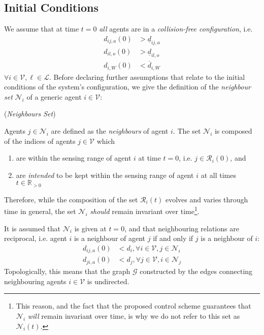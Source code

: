 \subsection{Initial Conditions}

We assume that at time $t=0$ \textit{all} agents are in a
\textit{collision-free configuration}, i.e.
\begin{subequations}
\begin{align}
    d_{ij,a}(0) &> \underline{d}_{ij,a} \\
    d_{il,o}(0) &> \underline{d}_{il,o} \\
    d_{i,W}(0)  &< \overline{d}_{i,W}
\label{eq:initially_coll_free}
\end{align}
\end{subequations}
$\forall i \in \mathcal{V}, \ell \in \mathcal{L}$. Before declaring further
assumptions that relate to the initial conditions of the system's configuration,
we give the definition of the \textit{neighbour set} $\mathcal{N}_i$ of a
generic agent $i \in \mathcal{V}$:
\begin{bw_box}
\begin{definition} (\textit{Neighbours Set})

Agents $j \in \mathcal{N}_i$ are defined as the \textit{neighbours} of
agent $i$. The set $\mathcal{N}_i$ is composed of the indices of agents
$j \in \mathcal{V}$ which
\begin{enumerate}
  \item are within the sensing range of agent $i$ at time $t=0$, i.e.
    $j \in \mathcal{R}_i(0)$, and
  \item are \textit{intended} to be kept within the sensing range of agent $i$ at all
    times $t \in \mathbb{R}_{> 0}$
\end{enumerate}
\end{definition}
\end{bw_box}

Therefore, while the composition of the set $\mathcal{R}_i(t)$ evolves and
varies through time in general, the set $\mathcal{N}_i$ \textit{should} remain
invariant over time\footnote{This reason, and the fact that the proposed
control scheme guarantees that $\mathcal{N}_i$ \textit{will} remain invariant
over time, is why we do not refer to this set as $\mathcal{N}_i(t)$.}.

It is assumed that $\mathcal{N}_i$ is given at $t=0$, and that neighbouring
relations are reciprocal, i.e. agent $i$ is a neighbour of agent $j$ if and
only if $j$ is a neighbour of $i$:
\begin{subequations}
\begin{align}
  d_{ij,a}(0) &< d_i, \forall i \in \mathcal{V}, j \in \mathcal{N}_i \label{eq:initially_connected_0} \\
  d_{ji,a}(0) &< d_j, \forall j \in \mathcal{V}, i \in \mathcal{N}_j \label{eq:initially_connected_1}
\end{align}
\end{subequations}
Topologically, this means that the graph $\mathcal{G}$ constructed by the edges
connecting neighbouring agents $i \in \mathcal{V}$ is undirected.

